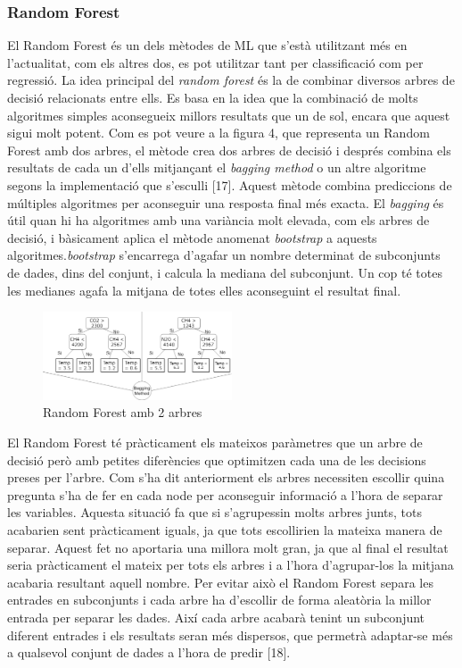 \documentclass[10pt,a4paper,twocolumn,twoside]{article}
\begin{document}
\subsubsection{Random Forest}
El Random Forest és un dels mètodes de ML que s'està utilitzant més en l'actualitat, com els altres dos, es pot utilitzar tant per classificació com per regressió. La idea principal del \textit{random forest} és la de combinar diversos arbres de decisió relacionats entre ells. Es basa en la idea que la combinació de molts algoritmes simples aconsegueix millors resultats que un de sol, encara que aquest sigui molt potent. Com es pot veure a la figura 4, que representa un Random Forest amb dos arbres, el mètode crea dos arbres de decisió i després combina els resultats de cada un d'ells mitjançant el \textit{bagging method} o un altre algoritme segons la implementació que s'esculli [17]. Aquest mètode combina prediccions de múltiples algoritmes per aconseguir una resposta final més exacta. El \textit{bagging} és útil quan hi ha algoritmes amb una variància molt elevada, com els arbres de decisió, i bàsicament aplica el mètode anomenat \textit{bootstrap} a aquests algoritmes.\textit{bootstrap} s'encarrega d'agafar un nombre determinat de subconjunts de dades, dins del conjunt, i calcula la mediana del subconjunt. Un cop té totes les medianes agafa la mitjana de totes elles aconseguint el resultat final.
\begin{figure}[!h]
\centering
	\includegraphics[width=0.5\textwidth]{../img/randomForest}
	\caption{Random Forest amb 2 arbres}
	\label{fig-RandomForest}
\end{figure}

El Random Forest té pràcticament els mateixos paràmetres que un arbre de decisió però amb petites diferències que optimitzen cada una de les decisions preses per l'arbre. Com s'ha dit anteriorment els arbres necessiten escollir quina pregunta s'ha de fer en cada node per aconseguir informació a l'hora de separar les variables. Aquesta situació fa que si s'agrupessin molts arbres junts, tots acabarien sent pràcticament iguals, ja que tots escollirien la mateixa manera de separar. Aquest fet no aportaria una millora molt gran, ja que al final el resultat seria pràcticament el mateix per tots els arbres i a l'hora d'agrupar-los la mitjana acabaria resultant aquell nombre. Per evitar això el Random Forest separa les entrades en subconjunts i cada arbre ha d'escollir de forma aleatòria la millor entrada per separar les dades. Així cada arbre acabarà tenint un subconjunt diferent entrades i els resultats seran més dispersos, que permetrà adaptar-se més a qualsevol conjunt de dades a l'hora de predir [18].
\end{document}
